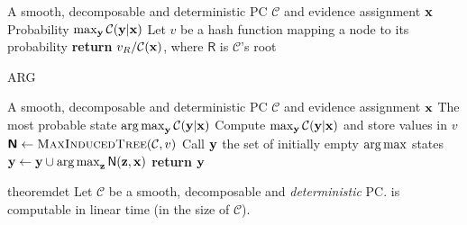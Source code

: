 \begin{algorithm}[t]
  \caption{\map}\label{alg:map}
  \begin{algorithmic}[1]
    \Require A smooth, decomposable and deterministic PC $\mathcal{C}$ and evidence assignment $\mathbf{x}$
    \Ensure Probability $\max_{\mathbf{y}}\mathcal{C}(\mathbf{y}|\mathbf{x})$
    \State Let $v$ be a hash function mapping a node to its probability
    \EndFor%
    \State \textbf{return} $v_{\normalfont{R}}/\mathcal{C}(\mathbf{x})$, where $\textsf{R}$ is
    $\mathcal{C}$'s root
  \end{algorithmic}
\end{algorithm}
\begin{algorithm}[t]
  \caption{\textsf{ARG}\map}\label{alg:argmap}
  \begin{algorithmic}[1]
    \Require A smooth, decomposable and deterministic PC $\mathcal{C}$ and evidence assignment $\mathbf{x}$
    \Ensure The most probable state $\operatorname*{\normalfont{arg\,max}}_{\mathbf{y}}\mathcal{C}(\mathbf{y}|\mathbf{x})$
    \State Compute $\max_{\mathbf{y}}\mathcal{C}(\mathbf{y}|\mathbf{x})$ and store values in $v$
    \State $\Nodes\gets\textproc{MaxInducedTree}(\mathcal{C}, v)$
    \State Call $\mathbf{y}$ the set of initially empty $\operatorname*{\normalfont{arg\,max}}$ states
      \State $\mathbf{y}\gets\mathbf{y}\cup\operatorname*{\normalfont{arg\,max}}_{\mathbf{z}}\operatorname{\textup{\textsf{N}}}(\mathbf{z},\mathbf{x})$%
    \EndFor%
    \State \textbf{return} $\mathbf{y}$
  \end{algorithmic}
\end{algorithm}

\begin{restatable}{theorem}{det}
  \label{thm:det}
  Let $\mathcal{C}$ be a smooth, decomposable and \emph{deterministic} PC. \map{} is computable in
  linear time (in the size of $\mathcal{C}$).
\end{restatable}

